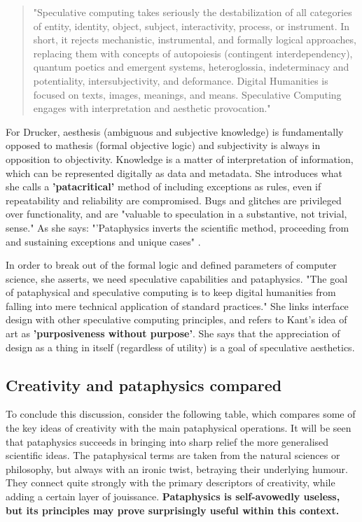\begin{quote}
"Speculative computing takes seriously the destabilization of all categories of entity, identity, object, subject, interactivity, process, or instrument. In short, it rejects mechanistic, instrumental, and formally logical approaches, replacing them with concepts of autopoiesis (contingent interdependency), quantum poetics and emergent systems, heteroglossia, indeterminacy and potentiality, intersubjectivity, and deformance. Digital Humanities is focused on texts, images, meanings, and means. Speculative Computing engages with interpretation and aesthetic provocation." \citep[p.29]{Drucker2009}
\end{quote}

For Drucker, aesthesis (ambiguous and subjective knowledge) is fundamentally opposed to mathesis (formal objective logic) and subjectivity is always in opposition to objectivity. Knowledge is a matter of interpretation of information, which can be represented digitally as data and metadata. She introduces what she calls a \textbf{'patacritical'} method of including exceptions as rules, even if repeatability and reliability are compromised. Bugs and glitches are privileged over functionality, and are "valuable to speculation in a substantive, not trivial, sense." As she says: "'Pataphysics inverts the scientific method, proceeding from and sustaining exceptions and unique cases" \citep{Drucker2007}.

In order to break out of the formal logic and defined parameters of computer science, she asserts, we need speculative capabilities and pataphysics. "The goal of pataphysical and speculative computing is to keep digital humanities from falling into mere technical application of standard practices." She links interface design with other speculative computing principles, and refers to Kant's idea of art as \textbf{'purposiveness without purpose'}. She says that the appreciation of design as a thing in itself (regardless of utility) is a goal of speculative aesthetics.

\subsection{Creativity and pataphysics compared}

To conclude this discussion, consider the following table, which compares some of the key ideas of creativity \citep{Boden2003, Indurkhya1997, Koestler1964} with the main pataphysical operations. It will be seen that pataphysics succeeds in bringing into sharp relief the more generalised scientific ideas. The pataphysical terms are taken from the natural sciences or philosophy, but always with an ironic twist, betraying their underlying humour. They connect quite strongly with the primary descriptors of creativity, while adding a certain layer of jouissance. \textbf{Pataphysics is self-avowedly useless, but its principles may prove surprisingly useful within this context.}

